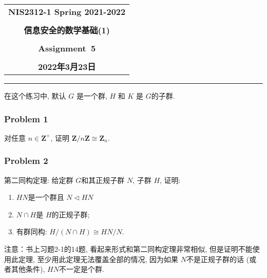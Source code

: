 \documentclass[a4paper,12pt]{ctexart}
\newcommand{\Z}{\mathbf{Z}}
\begin{document}
  \begin{center}

  \vspace{-0.3in}
  \begin{tabular}{c}
    \textbf{\Large NIS2312-1 Spring 2021-2022} \\
    \textbf{\Large  } \\
    \textbf{\Large  信息安全的数学基础(1)} \\
    \textbf{\Large  } \\
    \textbf{\Large  Assignment~5} \\
    \textbf{\Large  } \\
    \textbf{\Large 2022年3月23日} \\
  \end{tabular}
  \end{center}
  \noindent
  \rule{\linewidth}{0.4pt}

  在这个练习中, 默认 $G$ 是一个群, $H$ 和 $K$ 是 $ G $的子群.
\subsubsection*{Problem 1}
    对任意 $ n\in\Z^+ $, 证明 $ \Z/n\Z\cong\Z_n $.
\subsubsection*{Problem 2}
    第二同构定理: 给定群 $ G $和其正规子群 $ N $, 子群 $ H $, 证明:
    \begin{enumerate}
      \item $ HN $是一个群且 $ N\triangleleft HN $
      \item $ N\cap H $是 $ H $的正规子群;
      \item 有群同构: $ H/(N\cap H)\cong HN/N  $. 
    \end{enumerate}

    注意：书上习题2-1的14题, 看起来形式和第二同构定理非常相似, 但是证明不能使用此定理, 至少用此定理无法覆盖全部的情况, 因为如果 $ N $不是正规子群的话 (或者其他条件), $ HN $不一定是个群.
\end{document}
